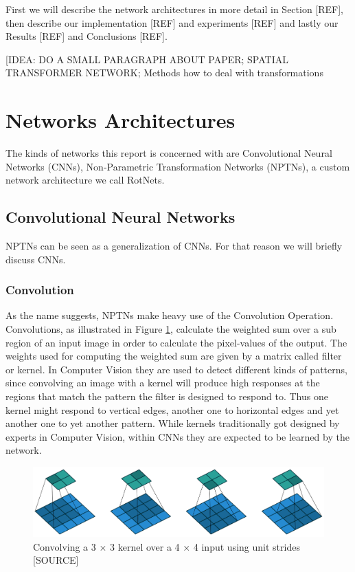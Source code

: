\documentclass{llncs}
\begin{document}
First we will describe the network architectures in more detail in Section [REF], then describe our implementation [REF] and experiments [REF] and lastly our Results [REF] and Conclusions [REF].

[IDEA: DO A SMALL PARAGRAPH ABOUT PAPER; SPATIAL TRANSFORMER NETWORK; Methods how to deal with transformations

\section{Networks Architectures}
The kinds of networks this report is concerned with are Convolutional Neural Networks (CNNs), Non-Parametric Transformation Networks (NPTNs), a custom network architecture we call RotNets.

\subsection{Convolutional Neural Networks}
NPTNs can be seen as a generalization of CNNs. For that reason we will briefly discuss CNNs. 
\subsubsection{Convolution}
As the name suggests, NPTNs make heavy use of the Convolution Operation. Convolutions, as illustrated in Figure \ref{fig:conv}, calculate the weighted sum over a sub region of an input image in order to calculate the pixel-values of the output. The weights used for computing the weighted sum are given by a matrix called filter or kernel. In Computer Vision they are used to detect different kinds of patterns, since convolving an image with a kernel will produce high responses at the regions that match the pattern the filter is designed to respond to. Thus one kernel might respond to vertical edges, another  one to horizontal edges and yet another one to yet another pattern. While kernels traditionally got designed by experts in Computer Vision, within CNNs they are expected to be learned by the network.
\begin{figure}
	\begin{center}
		\includegraphics[width=\textwidth]{result_images/Conv.png}
		\caption{Convolving a 3 $\times$ 3 kernel over a 4 $\times$ 4 input using unit strides [SOURCE]}
		\label{fig:conv}
	\end{center}
\end{figure}
\end{document}
